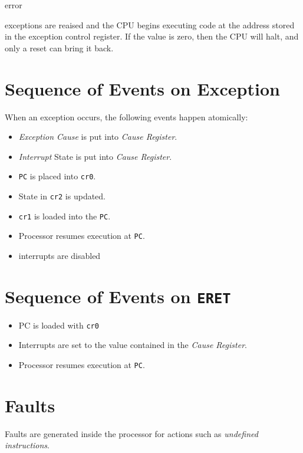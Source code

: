 
\deliberate error


exceptions are reaised and the CPU begins executing code at the
address stored in the exception control register.  If the value is
zero, then the CPU will halt, and only a reset can bring it back.

\section{Sequence of Events on Exception}

When an exception occurs, the following events happen atomically:

\begin{itemize}
\item \emph{Exception Cause} is put into \emph{Cause Register}.
\item \emph{Interrupt} State is put into \emph{Cause Register}.
\item \texttt{PC} is placed into \texttt{cr0}.
\item State in \texttt{cr2} is updated.
\item \texttt{cr1} is loaded into the \texttt{PC}.
\item Processor resumes execution at \texttt{PC}.
\item interrupts are disabled
\end{itemize}

\section{Sequence of Events on \texttt{ERET}}

\begin{itemize}
\item PC is loaded with \texttt{cr0}
\item Interrupts are set to the value contained in the \emph{Cause Register}.
\item Processor resumes execution at \texttt{PC}.
\end{itemize}


\section{Faults}

Faults are generated inside the \skl processor for actions such as
\emph{undefined instructions}.

